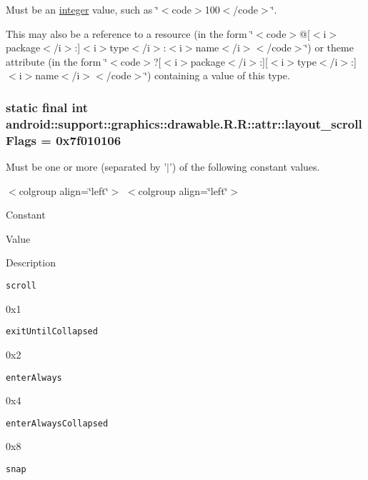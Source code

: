 Must be an \hyperlink{classandroid_1_1support_1_1graphics_1_1drawable_1_1_r_1_1integer}{integer} value, such as \char`\"{}$<$code$>$100$<$/code$>$\char`\"{}. 

This may also be a reference to a resource (in the form \char`\"{}$<$code$>$@\mbox{[}$<$i$>$package$<$/i$>$:\mbox{]}$<$i$>$type$<$/i$>$:$<$i$>$name$<$/i$>$$<$/code$>$\char`\"{}) or theme attribute (in the form \char`\"{}$<$code$>$?\mbox{[}$<$i$>$package$<$/i$>$:\mbox{]}\mbox{[}$<$i$>$type$<$/i$>$:\mbox{]}$<$i$>$name$<$/i$>$$<$/code$>$\char`\"{}) containing a value of this type. \hypertarget{classandroid_1_1support_1_1graphics_1_1drawable_1_1_r_1_1attr_3522b591271a932a0b78da425c68313e}{
\subsubsection[{layout\_\-scrollFlags}]{\setlength{\rightskip}{0pt plus 5cm}static final int android::support::graphics::drawable.R.R::attr::layout\_\-scrollFlags = 0x7f010106}}
\label{classandroid_1_1support_1_1graphics_1_1drawable_1_1_r_1_1attr_3522b591271a932a0b78da425c68313e}


Must be one or more (separated by '$|$') of the following constant values. \begin{TabularC}{0}
\hline
\end{TabularC}
$<$colgroup align=\char`\"{}left\char`\"{}$>$ $<$colgroup align=\char`\"{}left\char`\"{}$>$ 

Constant

Value

Description 

{\tt scroll}

0x1

{\tt exitUntilCollapsed}

0x2

{\tt enterAlways}

0x4

{\tt enterAlwaysCollapsed}

0x8

{\tt snap}

